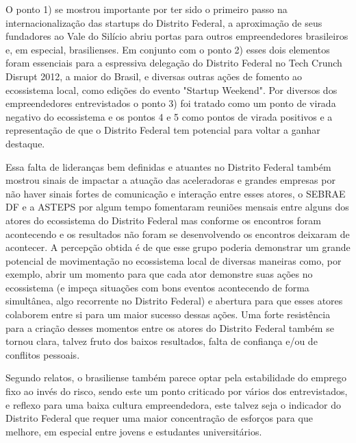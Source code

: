 O ponto 1) se mostrou importante por ter sido o primeiro passo na internacionalização das startups do Distrito Federal, a aproximação de seus fundadores ao Vale do Silício abriu portas para outros empreendedores brasileiros e, em especial, brasilienses. Em conjunto com o ponto 2) esses dois elementos foram essenciais para a espressiva delegação do Distrito Federal no Tech Crunch Disrupt 2012, a maior do Brasil, e diversas outras ações de fomento ao ecossistema local, como edições do evento "Startup Weekend". Por diversos dos empreendedores entrevistados o ponto 3) foi tratado como um ponto de virada negativo do ecossistema e os pontos 4 e 5 como pontos de virada positivos e a representação de que o Distrito Federal tem potencial para voltar a ganhar destaque. 

Essa falta de lideranças bem definidas e atuantes no Distrito Federal também mostrou sinais de impactar a atuação das aceleradoras e grandes empresas por não haver sinais fortes de comunicação e interação entre esses atores, o SEBRAE DF e a ASTEPS por algum tempo fomentaram reuniões mensais entre alguns dos atores do ecossistema do Distrito Federal mas conforme os encontros foram acontecendo e os resultados não foram se desenvolvendo os encontros deixaram de acontecer. A percepção obtida é de que esse grupo poderia demonstrar um grande potencial de movimentação no ecossistema local de diversas maneiras como, por exemplo, abrir um momento para que cada ator demonstre suas ações no ecossistema (e impeça situações com bons eventos acontecendo de forma simultânea, algo recorrente no Distrito Federal) e abertura para que esses atores colaborem entre si para um maior sucesso dessas ações. Uma forte resistência para a criação desses momentos entre os atores do Distrito Federal também se tornou clara, talvez fruto dos baixos resultados, falta de confiança e/ou de conflitos pessoais.

Segundo relatos, o brasiliense também parece optar pela estabilidade do emprego fixo ao invés do risco, sendo este um ponto criticado por vários dos entrevistados, e reflexo para uma baixa cultura empreendedora, este talvez seja o indicador do Distrito Federal que requer uma maior concentração de esforços para que melhore, em especial entre jovens e estudantes universitários. 

